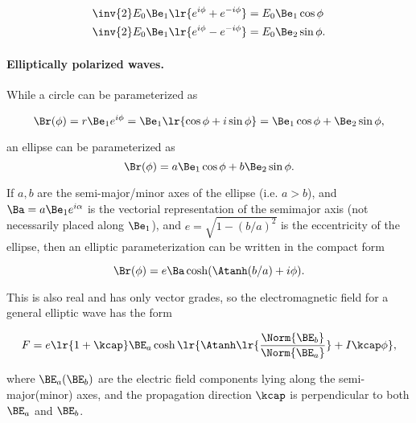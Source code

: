\begin{dmath}\label{eqn:ellipticalWaves:300}
\begin{aligned}
   \inv{2} E_0 \Be_1 \lr{ e^{i \phi} + e^{-i\phi} } &= E_0 \Be_1 \cos\phi \\
   \inv{2} E_0 \Be_1 \lr{ e^{i \phi} - e^{-i\phi} } &= E_0 \Be_2 \sin\phi.
\end{aligned}
\end{dmath}

\paragraph{Elliptically polarized waves.}

While a circle can be parameterized as

\begin{dmath}\label{eqn:ellipticalWaves:320}
\Br(\phi)
=
r \Be_1 e^{i \phi}
=
\Be_1 \lr{ \cos\phi + i \sin\phi }
=
\Be_1 \cos\phi + \Be_2 \sin\phi,
\end{dmath}

an ellipse can be parameterized as
\begin{dmath}\label{eqn:ellipticalWaves:340}
\Br(\phi)
=
a \Be_1 \cos\phi + b \Be_2 \sin\phi.
\end{dmath}

If \( a, b \) are the semi-major/minor axes of the ellipse (i.e. \( a > b \)),
and \( \Ba = a \Be_1 e^{i\alpha} \) is the vectorial representation of the semimajor axis (not necessarily placed along \( \Be_1 \)),
and \( e = \sqrt{1 - (b/a)^2} \) is the eccentricity of the ellipse,
then an elliptic parameterization can be written
\citep{hestenes1999nfc}
in the compact form

\begin{dmath}\label{eqn:ellipticalWaves:360}
\Br(\phi)
=
e \Ba \cosh( \Atanh(b/a) + i \phi).
\end{dmath}

This is also real and has only vector grades, so the electromagnetic field for a general elliptic wave has the form

\begin{dmath}\label{eqn:ellipticalWaves:380}
F
=
e \lr{ 1 + \kcap } \BE_a
\cosh\lr{ \Atanh\lr{ \frac{\Norm{\BE_b}}{\Norm{\BE_a}}} + I \kcap \phi},
\end{dmath}

where \( \BE_a(\BE_b) \) are the electric field components lying along the semi-major(minor) axes, and the propagation direction \( \kcap \) is perpendicular to both \( \BE_a \) and \(\BE_b\).

